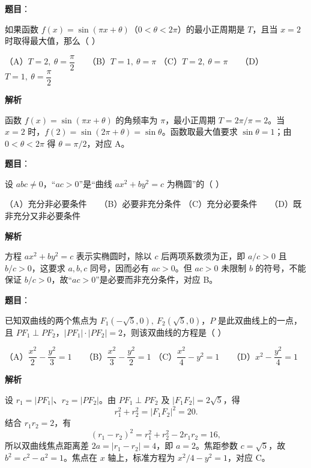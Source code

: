 \begin{answer}

\textbf{题目}：

如果函数 $f(x)=\sin(\pi x+\theta)$（$0<\theta<2\pi$）的最小正周期是 $T$，且当 $x=2$ 时取得最大值，那么（ ）

（A）$T=2,\ \theta=\dfrac{\pi}{2}$　　（B）$T=1,\ \theta=\pi$
（C）$T=2,\ \theta=\pi$　　（D）$T=1,\ \theta=\dfrac{\pi}{2}$

\textbf{解析}

函数 $f(x)=\sin(\pi x+\theta)$ 的角频率为 $\pi$，最小正周期 $T=2\pi/\pi=2$。当 $x=2$ 时，$f(2)=\sin(2\pi+\theta)=\sin\theta$。函数取最大值要求 $\sin\theta=1$；由 $0<\theta<2\pi$ 得 $\theta=\pi/2$，对应 A。


\end{answer}
\begin{answer}

\textbf{题目}：

设 $abc\ne 0$，“$ac>0$”是“曲线 $ax^2+by^2=c$ 为椭圆”的（ ）

（A）充分非必要条件　　（B）必要非充分条件
（C）充分必要条件　　（D）既非充分又非必要条件

\textbf{解析}

方程 $ax^2+by^2=c$ 表示实椭圆时，除以 $c$ 后两项系数须为正，即 $a/c>0$ 且 $b/c>0$，这要求 $a,b,c$ 同号，因而必有 $ac>0$。但 $ac>0$ 未限制 $b$ 的符号，不能保证 $b/c>0$，故“$ac>0$”是必要而非充分条件，对应 B。


\end{answer}
\begin{answer}

\textbf{题目}：

已知双曲线的两个焦点为 $F_1(-\sqrt5,0),\ F_2(\sqrt5,0)$，$P$ 是此双曲线上的一点，且 $PF_1\perp PF_2$，$|PF_1|\cdot|PF_2|=2$，则该双曲线的方程是（ ）

（A）$\dfrac{x^2}{2}-\dfrac{y^2}{3}=1$　　（B）$\dfrac{x^2}{3}-\dfrac{y^2}{2}=1$
（C）$\dfrac{x^2}{4}-y^2=1$　　（D）$x^2-\dfrac{y^2}{4}=1$

\textbf{解析}

设 $r_1=|PF_1|$、$r_2=|PF_2|$。由 $PF_1\perp PF_2$ 及 $|F_1F_2|=2\sqrt5$，得
\nopagebreak[4]
\[r_1^2+r_2^2=|F_1F_2|^2=20.\]
结合 $r_1r_2=2$，有
\nopagebreak[4]
\[(r_1-r_2)^2=r_1^2+r_2^2-2r_1r_2=16,\]
所以双曲线焦点距离差 $2a=|r_1-r_2|=4$，即 $a=2$。焦距参数 $c=\sqrt5$，故 $b^2=c^2-a^2=1$。焦点在 $x$ 轴上，标准方程为 $x^2/4-y^2=1$，对应 C。


\end{answer}
